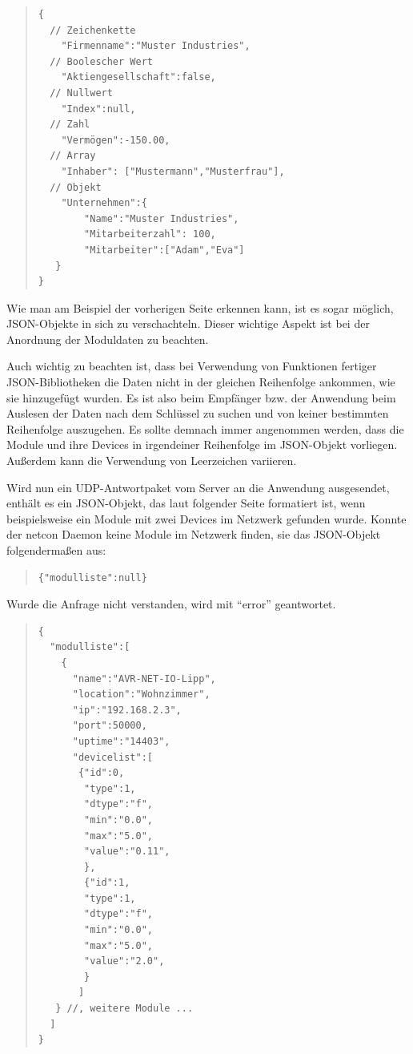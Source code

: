 \documentclass[a4paper,14pt,headsepline]{scrartcl}
\begin{document}
\begin{quote}
\begin{verbatim}
{
  // Zeichenkette
    "Firmenname":"Muster Industries",
  // Boolescher Wert
    "Aktiengesellschaft":false,
  // Nullwert
    "Index":null,
  // Zahl
    "Vermögen":-150.00,
  // Array
    "Inhaber": ["Mustermann","Musterfrau"],
  // Objekt
    "Unternehmen":{
   	    "Name":"Muster Industries",
   	    "Mitarbeiterzahl": 100,
   	    "Mitarbeiter":["Adam","Eva"]
   }
}

\end{verbatim}
\end{quote}

\newpage
Wie man am Beispiel der vorherigen Seite erkennen kann, ist es sogar möglich, JSON-Objekte in sich zu verschachteln. Dieser wichtige Aspekt ist bei der Anordnung der Moduldaten zu beachten. 

Auch wichtig zu beachten ist, dass bei Verwendung von Funktionen fertiger JSON-Bibliotheken die Daten nicht in der gleichen Reihenfolge ankommen, wie sie hinzugefügt wurden. Es ist also beim Empfänger bzw. der Anwendung beim Auslesen der Daten nach dem Schlüssel zu suchen und von keiner bestimmten Reihenfolge auszugehen. Es sollte demnach immer angenommen werden, dass die Module und ihre Devices in irgendeiner Reihenfolge im JSON-Objekt vorliegen. Außerdem kann die Verwendung von Leerzeichen variieren. 

Wird nun ein UDP-Antwortpaket vom Server an die Anwendung ausgesendet, enthält es ein JSON-Objekt, das laut folgender Seite formatiert ist, wenn beispielsweise ein Module mit zwei Devices im Netzwerk gefunden wurde. Konnte der netcon Daemon keine Module im Netzwerk finden, sie das JSON-Objekt folgendermaßen aus: 

\begin{quote}
\begin{verbatim}
{"modulliste":null}
\end{verbatim}
\end{quote}

Wurde die Anfrage nicht verstanden, wird mit ``error'' geantwortet. 


\newpage

\begin{quote}
\begin{verbatim}
{
  "modulliste":[
    {
      "name":"AVR-NET-IO-Lipp",
      "location":"Wohnzimmer",
      "ip":"192.168.2.3",
      "port":50000,
      "uptime":"14403",
      "devicelist":[
       {"id":0,
        "type":1,
        "dtype":"f",
        "min":"0.0",
        "max":"5.0",
        "value":"0.11",
        },
        {"id":1,
        "type":1,
        "dtype":"f",
        "min":"0.0",
        "max":"5.0",
        "value":"2.0",
        }
       ]
   } //, weitere Module ...
  ]
}

\end{verbatim}
\end{quote}
\end{document}
